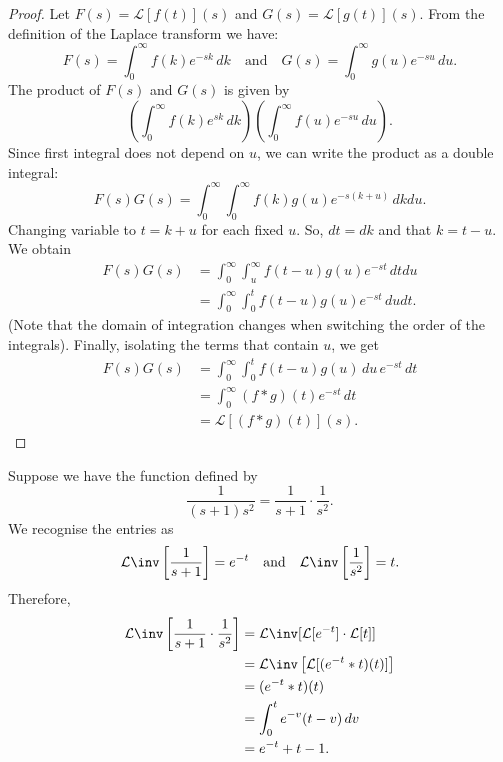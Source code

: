 \documentclass[12pt, a4paper]{article}
\newcommand{\CL}{\mathcal{L}}
\begin{document}
\begin{proof}
    Let \(F(s) = \CL[f(t)](s)\) and \(G(s) = \CL[g(t)](s)\). From the definition of the Laplace transform we have:
    \[F(s) = \int_{0}^{\infty} f(k) e^{-sk} \, dk \quad \text{and} \quad G(s) = \int_{0}^{\infty} g(u) e^{-su} \, du.\]
    The product of \(F(s)\) and \(G(s)\) is given by 
    \[\left( \int_{0}^{\infty} f(k)e^{sk} \, dk \right)\left( \int_{0}^{\infty} f(u)e^{-su} \,du \right).\]
    Since first integral does not depend on \(u\), we can write the product as a double integral: 
    \[F(s)G(s) = \int_{0}^{\infty} \int_{0}^{\infty} f(k)g(u) e^{-s(k+u)} \, dk du.\]
    Changing variable to \(t= k+u\) for each fixed \(u\). So, \(dt= dk\) and that \(k=t-u\). We obtain 
    \[\begin{aligned}
        F(s)G(s) &= \int_{0}^{\infty} \int_{u}^{\infty} f(t-u)g(u) e^{-st}\, dt du \\
        &= \int_{0}^{\infty} \int_{0}^{t} f(t-u)g(u) e^{-st} \, du dt.
    \end{aligned}\]
    (Note that the domain of integration changes when switching the order of the integrals). Finally, isolating the terms that contain \(u\), we get 
    \[\begin{aligned}
        F(s)G(s) &= \int_{0}^{\infty} \int_{0}^{t} f(t-u)g(u) \, du \, e^{-st} \, dt \\
        &= \int_{0}^{\infty} (f*g)(t) e^{-st} \, dt \\
        &= \CL[(f*g)(t)](s).
    \end{aligned}\]
\end{proof}

\begin{mdexample}
    Suppose we have the function defined by 
    \[\frac{1}{(s+1)s^2} = \frac{1}{s+1} \cdot \frac{1}{s^2}.\]
    We recognise the entries as 
    \[\CL\inv\left[ \frac{1}{s+1} \right] = e^{-t} \quad \text{and} \quad \CL\inv\left[ \frac{1}{s^2} \right] =t.\]
    Therefore, 
    \[\begin{aligned}
        \CL\inv\left[ \frac{1}{s+1} \cdot \frac{1}{s^2} \right] &= \CL\inv[\CL[e^{-t}] \cdot \CL[t]] \\
        &= \CL\inv\left[ \CL[(e^{-t}*t)(t)] \right] \\
        &= (e^{-t}*t)(t) \\
        &= \int_{0}^{t} e^{-v}(t-v) \, dv \\
        &= e^{-t} +t-1.
    \end{aligned}\]
\end{mdexample}
\end{document}
